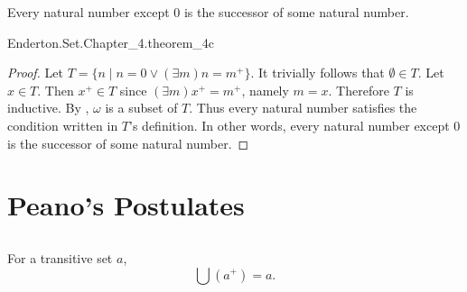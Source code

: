\documentclass{report}
\begin{document}
  \begin{theorem}[4C]
    Every natural number except $0$ is the successor of some natural number.
  \end{theorem}

    {Enderton.Set.Chapter\_4.theorem\_4c}

  \begin{proof}
    Let $T = \{n \mid n = 0 \lor (\exists m) n = m^+\}$.
    It trivially follows that $\emptyset \in T$.
    Let $x \in T$.
    Then $x^+ \in T$ since $(\exists m) x^+ = m^+$, namely $m = x$.
    Therefore $T$ is inductive.
    By , $\omega$ is a subset of $T$.
    Thus every natural number satisfies the condition written in $T$'s
      definition.
    In other words, every natural number except $0$ is the successor of some
      natural number.
  \end{proof}

\section{Peano's Postulates}%

\subsection{}%

  \begin{theorem}[4E]
    For a transitive set $a$, $$\bigcup \left(a^+\right) = a.$$
  \end{theorem}
\end{document}
